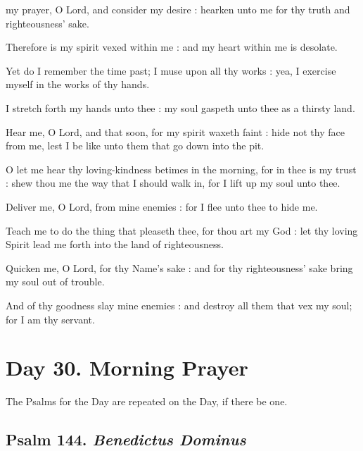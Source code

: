 my prayer, O Lord, and consider my desire : hearken unto me for thy truth and righteousness' sake.\par
{}
Therefore is my spirit vexed within me : and my heart within me is desolate.\par
{}Yet do I remember the time past; I muse upon all thy works : yea, I exercise myself in the works of thy hands.\par
{}I stretch forth my hands unto thee : my soul gaspeth unto thee as a thirsty land.\par
{}Hear me, O Lord, and that soon, for my spirit waxeth faint : hide not thy face from me, lest I be like unto them that go down into the pit.\par
{}O let me hear thy loving-kindness betimes in the morning, for in thee is my trust : shew thou me the way that I should walk in, for I lift up my soul unto thee.\par
{}Deliver me, O Lord, from mine enemies : for I flee unto thee to hide me.\par
{}Teach me to do the thing that pleaseth thee, for thou art my God : let thy loving Spirit lead me forth into the land of righteousness.\par
{}Quicken me, O Lord, for thy Name's sake : and for thy righteousness' sake bring my soul out of trouble.\par
{}And of thy goodness slay mine enemies : and destroy all them that vex my soul; for I am thy servant.\par


\clearpage
\section*{Day 30. Morning Prayer}
\begin{secrubric}
    The Psalms for the  Day are repeated on the  Day, if there be one.
\end{secrubric}

\subsection{Psalm 144. \textit{Benedictus Dominus}}

